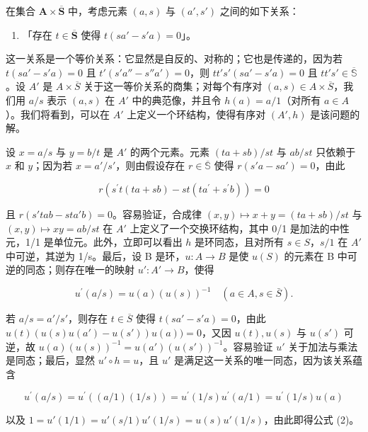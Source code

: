 在集合 \(\mathbf{A} \times \overline{\mathbf{S}}\) 中，考虑元素 \((a, s)\) 与 \((a', s')\) 之间的如下关系：

\begin{enumerate}
\def\labelenumi{(\arabic{enumi})}
\tightlist
\item
 「存在 \(t \in \overline{\mathbf{S}}\) 使得 \(t(sa' - s'a) = 0\)」。
\end{enumerate}

这一关系是一个等价关系：它显然是自反的、对称的；它也是传递的，因为若 \(t(sa' - s'a) = 0\) 且 \(t'(s'a'' - s''a') = 0\)，则 \(tt's'(sa' - s'a) = 0\) 且 \(tt's' \in \overline{\mathbb{S}}\)。设 \(A'\) 是 \(A \times \overline{S}\) 关于这一等价关系的商集；对每个有序对 \((a, s) \in A \times \overline{S}\)，我们用 \(a/s\) 表示 \((a, s)\) 在 \(A'\) 中的典范像，并且令 \(h(a) = a/1\)（对所有 \(a \in A\)）。我们将看到，可以在 \(A'\) 上定义一个环结构，使得有序对 \((A', h)\) 是该问题的解。

设 \(x = a / s\) 与 \(y = b / t\) 是 \(A'\) 的两个元素。元素 \((ta + sb) / st\) 与 \(ab / st\) 只依赖于 \(x\) 和 \(y\)；因为若 \(x = a' / s'\)，则由假设存在 \(r \in \overline{\mathbb{S}}\) 使得 \(r(s'a - sa') = 0\)，由此

\[
r \left(s ^ {\prime} t (t a + s b) - s t \left(t a ^ {\prime} + s ^ {\prime} b\right)\right) = 0
\]

且 \(r(s'tab - sta'b) = 0\)。容易验证，合成律 \((x,y) \mapsto x + y = (ta + sb)/st\) 与 \((x,y) \mapsto xy = ab/st\) 在 \(A'\) 上定义了一个交换环结构，其中 0/1 是加法的中性元，1/1 是单位元。此外，立即可以看出 \(h\) 是环同态，且对所有 \(s \in S\)，\(s/1\) 在 \(A'\) 中可逆，其逆为 1/s。最后，设 B 是环，\(u: A \to B\) 是使 \(u(S)\) 的元素在 B 中可逆的同态；则存在唯一的映射 \(u': A' \to B\)，使得

\[
u ^ {\prime} (a / s) = u (a) (u (s)) ^ {- 1} \quad (a \in A, s \in \bar {S}).\tag{2}
\]

若 \(a / s = a' / s'\)，则存在 \(t \in \overline{S}\) 使得 \(t(sa' - s'a) = 0\)，由此 \(u(t)(u(s)u(a') - u(s'))u(a)) = 0\)，又因 \(u(t), u(s)\) 与 \(u(s')\) 可逆，故 \(u(a)(u(s))^{-1} = u(a')(u(s'))^{-1}\)。容易验证 \(u'\) 关于加法与乘法是同态；最后，显然 \(u' \circ h = u\)，且 \(u'\) 是满足这一关系的唯一同态，因为该关系蕴含

\[
u ^ {\prime} (a / s) = u ^ {\prime} ((a / 1) (1 / s)) = u ^ {\prime} (1 / s) u ^ {\prime} (a / 1) = u ^ {\prime} (1 / s) u (a)
\]

以及 \(1 = u'(1/1) = u'(s/1)u'(1/s) = u(s)u'(1/s)\)，由此即得公式 (2)。

